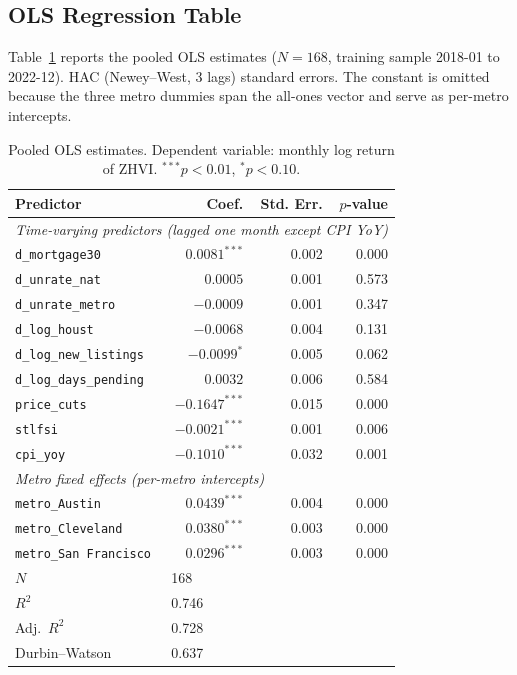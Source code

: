 \subsection{OLS Regression Table}

Table~\ref{tab:ols} reports the pooled OLS estimates ($N=168$, training sample 2018-01 to 2022-12). HAC (Newey--West, 3 lags) standard errors. The constant is omitted because the three metro dummies span the all-ones vector and serve as per-metro intercepts.

\begin{table}[!htb]
\centering
\small
\caption{Pooled OLS estimates. Dependent variable: monthly log return of ZHVI. ${}^{***}p<0.01$, ${}^{*}p<0.10$.}
\label{tab:ols}
\begin{tabular}{lrrr}
\hline
Predictor & Coef. & Std. Err. & $p$-value \\
\hline
\multicolumn{4}{l}{\textit{Time-varying predictors (lagged one month except CPI YoY)}} \\
\texttt{d\_mortgage30}        &  $0.0081^{***}$  & 0.002 & 0.000 \\
\texttt{d\_unrate\_nat}       &  $0.0005$        & 0.001 & 0.573 \\
\texttt{d\_unrate\_metro}     & $-0.0009$        & 0.001 & 0.347 \\
\texttt{d\_log\_houst}        & $-0.0068$        & 0.004 & 0.131 \\
\texttt{d\_log\_new\_listings}& $-0.0099^{*}$    & 0.005 & 0.062 \\
\texttt{d\_log\_days\_pending}&  $0.0032$        & 0.006 & 0.584 \\
\texttt{price\_cuts}          & $-0.1647^{***}$  & 0.015 & 0.000 \\
\texttt{stlfsi}               & $-0.0021^{***}$  & 0.001 & 0.006 \\
\texttt{cpi\_yoy}             & $-0.1010^{***}$  & 0.032 & 0.001 \\
\hline
\multicolumn{4}{l}{\textit{Metro fixed effects (per-metro intercepts)}} \\
\texttt{metro\_Austin}        &  $0.0439^{***}$  & 0.004 & 0.000 \\
\texttt{metro\_Cleveland}     &  $0.0380^{***}$  & 0.003 & 0.000 \\
\texttt{metro\_San~Francisco} &  $0.0296^{***}$  & 0.003 & 0.000 \\
\hline
$N$ & \multicolumn{3}{l}{168} \\
$R^{2}$ & \multicolumn{3}{l}{0.746} \\
Adj.~$R^{2}$ & \multicolumn{3}{l}{0.728} \\
Durbin--Watson & \multicolumn{3}{l}{0.637} \\
\hline
\end{tabular}
\end{table}

